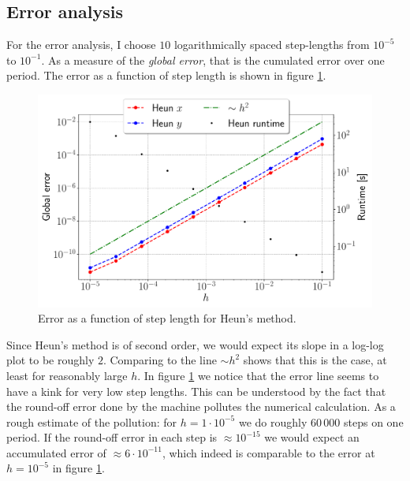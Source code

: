 \subsection{Error analysis}\label{sec:error}

For the error analysis, I choose $10$ logarithmically spaced step-lengths from $10^{-5}$ to $10^{-1}$. As a measure of the \textit{global error}, that is the cumulated error over one period. The error as a function of step length is shown in figure \ref{fig:err_heun}.
\begin{figure}[htb]
		\centering
		\includegraphics[width =0.8\columnwidth]{../fig/err_heun.pdf}
		\caption{Error as a function of step length for Heun's method.}
		\label{fig:err_heun}
\end{figure}
Since Heun's method is of second order, we would expect its slope in a log-log plot to be roughly $2$. Comparing to the line $\sim h^2$ shows that this is the case, at least for reasonably large $h$. In figure \ref{fig:err_heun} we notice that the error line seems to have a kink for very low step lengths. This can be understood by the fact that the round-off error done by the machine pollutes the numerical calculation. As a rough estimate of the pollution: for $h = 1\cdot 10^{-5}$ we do roughly $60\,000$ steps on one period. If the round-off error in each step is $\approx 10^{-15}$ we would expect an accumulated error of $\approx 6\cdot 10^{-11}$, which indeed is comparable to the error at $h = 10^{-5}$ in figure \ref{fig:err_heun}.  

